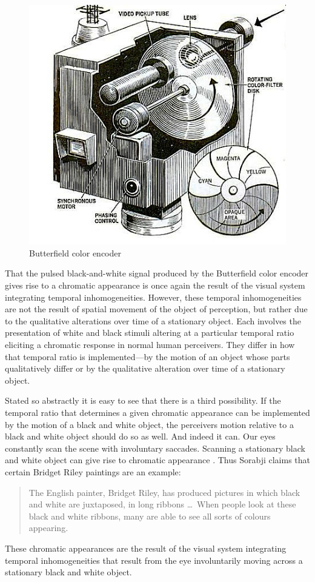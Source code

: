 \begin{figure}[htbp]
    \centering
        \includegraphics[scale=.55]{graphics/color_encoder.jpg}
    \caption{Butterfield color encoder \citep{Shatavsky:1968vn}}
    \label{fig:3}
\end{figure}

That the pulsed black-and-white signal produced by the Butterfield color encoder gives rise to a chromatic appearance is once again the result of the visual system integrating temporal inhomogeneities. However, these temporal inhomogeneities are not the result of spatial movement of the object of perception, but rather due to the qualitative alterations over time of a stationary object. Each involves the presentation of white and black stimuli altering at a particular temporal ratio eliciting a chromatic response in normal human perceivers. They differ in how that temporal ratio is implemented---by the motion of an object whose parts qualitatively differ or by the qualitative alteration over time of a stationary object. 

Stated so abstractly it is easy to see that there is a third possibility. If the temporal ratio that determines a given chromatic appearance can be implemented by the motion of a black and white object, the perceivers motion relative to a black and white object should do so as well. And indeed it can. Our eyes constantly scan the scene with involuntary saccades. Scanning a stationary black and white object can give rise to chromatic appearance \citep[72]{Hardin:1993kn}. Thus Sorabji claims that certain Bridget Riley paintings are an example:
\begin{quote}
    The English painter, Bridget Riley, has produced pictures in which black and white are juxtaposed, in long ribbons \ldots\ When people look at these black and white ribbons, many are able to see all sorts of colours appearing. \citep[295]{Sorabji:2022qf}
\end{quote}
These chromatic appearances are the result of the visual system integrating temporal inhomogeneities that result from the eye involuntarily moving across a stationary black and white object.

